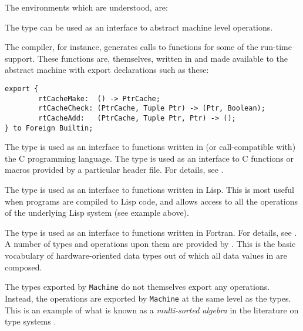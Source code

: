 The environments which are understood, are:

%
%
The type  can be used as an interface to abstract machine
level operations.  

The \asharp{} compiler, for instance, generates calls to functions for
some of the run-time support.  These functions are, themselves,
written in \asharp{} and made available to the abstract machine with
export declarations such as these:

\begin{small}
\begin{verbatim}
export {
        rtCacheMake:  () -> PtrCache;
        rtCacheCheck: (PtrCache, Tuple Ptr) -> (Ptr, Boolean);
        rtCacheAdd:   (PtrCache, Tuple Ptr, Ptr) -> ();
} to Foreign Builtin;
\end{verbatim}
\end{small}

{}
%
%
The type  is used as an interface to functions written in
(or call-compatible with) the C programming language.
The type   is used as an interface to
C functions or macros provided by a particular header file.
For details, see .

%
%
The type  is used as an interface to functions written in Lisp.  
This is most useful when \asharp{} programs are compiled to Lisp code, and
allows access to all the operations of the underlying Lisp system (see
 example above).

%
%
The type  is used as an interface to functions written in Fortran.
For details, see .
%
A number of types and operations upon them are provided by .
This is the basic vocabulary of hardware-oriented data types out of which
all data values in \asharp{} are composed.  

The types exported by \verb+Machine+ do not themselves export any operations.
Instead, the operations are exported by \verb"Machine" at the same level
as the types.  This is an example of what is known as a
{\em multi-sorted algebra} in the literature on type systems%
.

